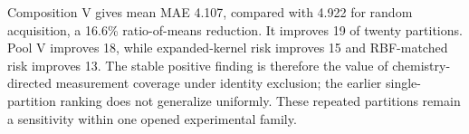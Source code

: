 Composition V gives mean MAE 4.107, compared with 4.922 for random acquisition, a 16.6\% ratio-of-means reduction. It improves 19 of twenty partitions. Pool V improves 18, while expanded-kernel risk improves 15 and RBF-matched risk improves 13. The stable positive finding is therefore the value of chemistry-directed measurement coverage under identity exclusion; the earlier single-partition ranking does not generalize uniformly. These repeated partitions remain a sensitivity within one opened experimental family.
